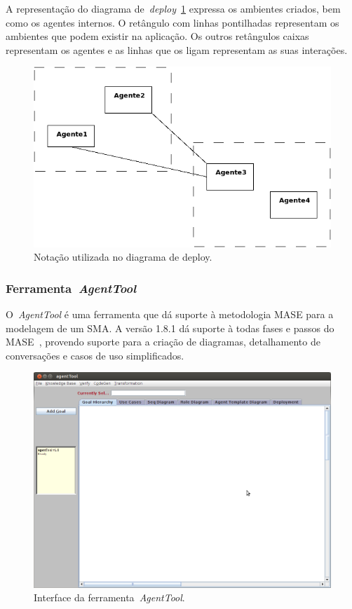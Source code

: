 A representação do diagrama de~\emph{deploy}~\ref{fig:exemplo-diagrama-deploy} expressa os ambientes criados, bem como os agentes internos. O retângulo com linhas pontilhadas representam os ambientes que podem existir na aplicação. Os outros retângulos caixas representam os agentes e as linhas que os ligam representam as suas interações.

\begin{figure}
	\centering
	\includegraphics[scale=0.65]{images/exemplo-diagrama-deploy.png}
	\caption{Notação utilizada no diagrama de deploy.}
	\label{fig:exemplo-diagrama-deploy}
\end{figure}

\subsubsection{Ferramenta~\emph{AgentTool}}

O~\emph{AgentTool} é uma ferramenta que dá suporte à metodologia MASE para a modelagem de um SMA. A versão 1.8.1 dá suporte à todas fases e passos do MASE~\cite{agentTool2012}, provendo suporte para a criação de diagramas, detalhamento de conversações e casos de uso simplificados.

\begin{figure}
	\centering
	\includegraphics[scale=0.65]{images/interface-agent-tool.png}
	\caption{Interface da ferramenta~\emph{AgentTool}.}
	\label{fig:interface-agent-tool}
\end{figure}

